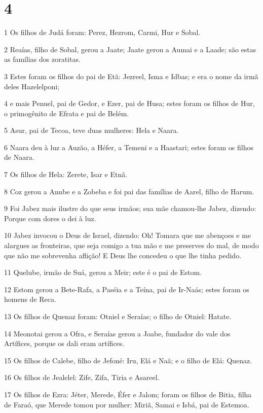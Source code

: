 \chapter{4}

\par 1 Os filhos de Judá foram: Perez, Hezrom, Carmi, Hur e Sobal.
\par 2 Reaías, filho de Sobal, gerou a Jaate; Jaate gerou a Aumai e a Laade; são estas as famílias dos zoratitas.
\par 3 Estes foram os filhos do pai de Etã: Jezreel, Isma e Idbas; e era o nome da irmã deles Hazelelponi;
\par 4 e mais Penuel, pai de Gedor, e Ezer, pai de Husa; estes foram os filhos de Hur, o primogênito de Efrata e pai de Belém.
\par 5 Asur, pai de Tecoa, teve duas mulheres: Hela e Naara.
\par 6 Naara deu à luz a Auzão, a Héfer, a Temeni e a Haastari; estes foram os filhos de Naara.
\par 7 Os filhos de Hela: Zerete, Isar e Etnã.
\par 8 Coz gerou a Anube e a Zobeba e foi pai das famílias de Aarel, filho de Harum.
\par 9 Foi Jabez mais ilustre do que seus irmãos; sua mãe chamou-lhe Jabez, dizendo: Porque com dores o dei à luz.
\par 10 Jabez invocou o Deus de Israel, dizendo: Oh! Tomara que me abençoes e me alargues as fronteiras, que seja comigo a tua mão e me preserves do mal, de modo que não me sobrevenha aflição! E Deus lhe concedeu o que lhe tinha pedido.
\par 11 Quelube, irmão de Suá, gerou a Meir; este é o pai de Estom.
\par 12 Estom gerou a Bete-Rafa, a Paséia e a Teína, pai de Ir-Naás; estes foram os homens de Reca.
\par 13 Os filhos de Quenaz foram: Otniel e Seraías; o filho de Otniel: Hatate.
\par 14 Meonotai gerou a Ofra, e Seraías gerou a Joabe, fundador do vale dos Artífices, porque os dali eram artífices.
\par 15 Os filhos de Calebe, filho de Jefoné: Iru, Elá e Naã; e o filho de Elá: Quenaz.
\par 16 Os filhos de Jealelel: Zife, Zifa, Tiria e Asareel.
\par 17 Os filhos de Ezra: Jéter, Merede, Éfer e Jalom; foram os filhos de Bitia, filha de Faraó, que Merede tomou por mulher: Miriã, Samai e Isbá, pai de Estemoa.
